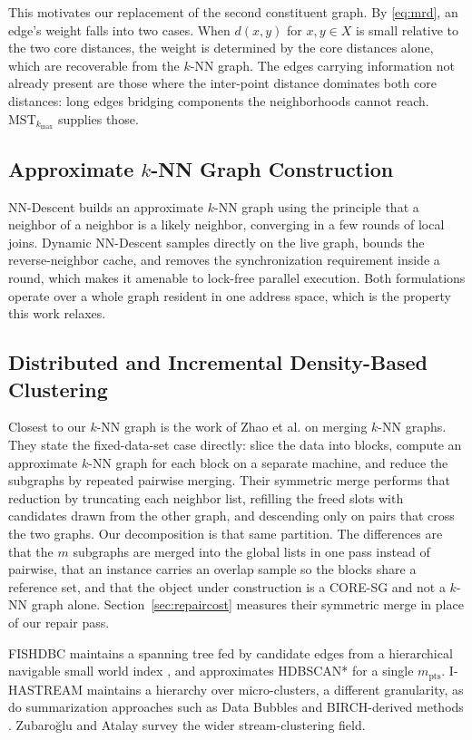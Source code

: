 \documentclass{ieeeaccess}
\newcommand{\kmax}{k_{\max}}
\newcommand{\mpts}{m_{\mathrm{pts}}}
\begin{document}
This motivates our replacement of the second constituent graph. By
\eqref{eq:mrd}, an edge's weight falls into two cases. When $d(x,y)$ for
$x, y \in X$ is small relative to the two core distances, the weight is
determined by the core distances alone, which are recoverable from the $k$-NN
graph. The edges carrying information not already present are those where the
inter-point distance dominates both core distances: long edges bridging
components the neighborhoods cannot reach. $\mathrm{MST}_{\kmax}$ supplies
those.

\subsection{Approximate $k$-NN Graph Construction}

NN-Descent \cite{nndescent} builds an approximate $k$-NN graph using the
principle that a neighbor of a neighbor is a likely neighbor, converging in a
few rounds of local joins. Dynamic NN-Descent \cite{dynamic_nndescent} samples
directly on the live graph, bounds the reverse-neighbor cache, and removes the
synchronization requirement inside a round, which makes it amenable to
lock-free parallel execution. Both formulations operate over a whole graph
resident in one address space, which is the property this work relaxes.

\subsection{Distributed and Incremental Density-Based Clustering}

Closest to our $k$-NN graph is the work of Zhao et al. \cite{knn_merge} on
merging $k$-NN graphs. They state the fixed-data-set case directly: slice the
data into blocks, compute an approximate $k$-NN graph for each block on a
separate machine, and reduce the subgraphs by repeated pairwise merging. Their
symmetric merge performs that reduction by truncating each neighbor list,
refilling the freed slots with candidates drawn from the other graph, and
descending only on pairs that cross the two graphs. Our decomposition is that
same partition. The differences are that the $m$ subgraphs are merged into the
global lists in one pass instead of pairwise, that an instance carries an
overlap sample so the blocks share a reference set, and that the object under
construction is a CORE-SG and not a $k$-NN graph alone.
Section~\ref{sec:repaircost} measures their symmetric merge in place of our
repair pass.

FISHDBC \cite{fishdbc} maintains a spanning tree fed by candidate edges from a
hierarchical navigable small world index \cite{hnsw}, and approximates HDBSCAN*
for a single $\mpts$. I-HASTREAM \cite{ihastream} maintains a hierarchy over
micro-clusters, a different granularity, as do summarization approaches such as
Data Bubbles \cite{databubbles} and BIRCH-derived methods \cite{birch}.
Zubaro\u{g}lu and Atalay \cite{streamreview} survey the wider stream-clustering
field.
\end{document}
